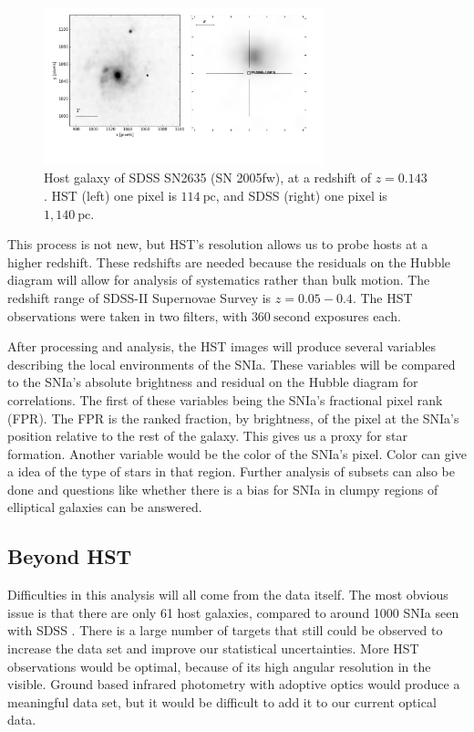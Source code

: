 \documentclass[apj, iop]{emulateapj}
\newcommand{\sn}{SNIa}
\begin{document}
\begin{figure}
	\includegraphics[width=3.2in]{SN2635-combined-inverted.pdf}
	\caption{Host galaxy of SDSS SN2635 (SN 2005fw), at a redshift of $z=0.143$. HST 
	(left) one pixel is $114~\text{pc}$, and SDSS (right) one pixel is $1,140~\text{pc}$.}
	\label{f:galaxy-compare}
\end{figure}

This process is not new, but HST's resolution allows us to probe hosts at a
higher redshift. These redshifts are needed because the residuals on the Hubble
diagram will allow for analysis of systematics rather than bulk motion. The
redshift range of SDSS-II Supernovae Survey is $z=0.05-0.4$. The HST
observations were taken in two filters, with $360~\text{second}$ exposures each.

After processing and analysis, the HST images will produce several variables
describing the local environments of the \sn{}. These variables will be compared
to the \sn{}'s absolute brightness and residual on the Hubble diagram for
correlations. The first of these variables being the \sn{}'s fractional pixel
rank (FPR). The FPR is the ranked fraction, by brightness, of the pixel at the
\sn{}'s position relative to the rest of the galaxy. This gives us a proxy for
star formation. Another variable would be the color of the \sn{}'s pixel. Color
can give a idea of the type of stars in that region. Further analysis of subsets
can also be done and questions like whether there is a bias for \sn{} in clumpy
regions of elliptical galaxies can be answered.


\subsection{Beyond HST}\label{beyond-hst}

Difficulties in this analysis will all come from the data itself. The most
obvious issue is that there are only 61 host galaxies, compared to around 1000
\sn{} seen with SDSS \citep{Campbell13}. There is a large number of targets
that still could be observed to increase the data set and improve our
statistical uncertainties. More HST observations would be optimal, because of
its high angular resolution in the visible. Ground based infrared photometry
with adoptive optics would produce a meaningful data set, but it would be
difficult to add it to our current optical data.
\end{document}
